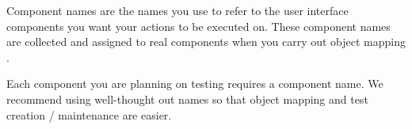 Component names are the names you use to refer to the user interface components you want your actions to be executed on. These component names are collected and assigned to real components when you carry out object mapping . 


Each component you are planning on testing requires a component name. We recommend using well-thought out names so that object mapping and test creation / maintenance are easier.
